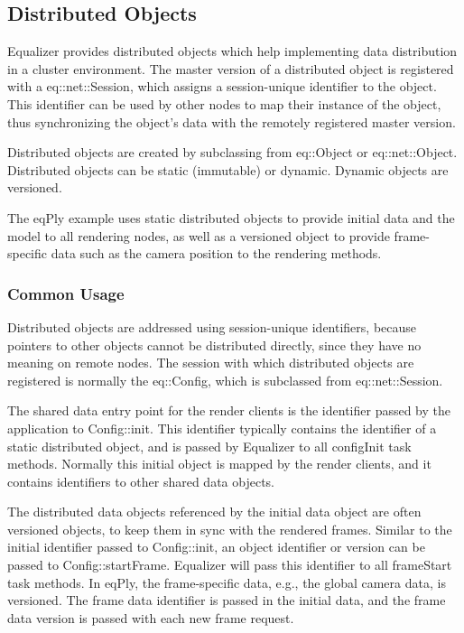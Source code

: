 \documentclass[10pt,a4]{scrartcl}
\begin{document}
\subsection{\label{sNetObject}Distributed Objects}

Equalizer provides distributed objects which help implementing data
distribution in a cluster environment. The master version of a
distributed object is registered with a \textsf{eq::net::Session}, which
assigns a session-unique identifier to the object. This identifier can
be used by other nodes to map their instance of the object, thus
synchronizing the object's data with the remotely registered master
version.

Distributed objects are created by subclassing from \textsf{eq::Object}
or \textsf{eq::net::Object}. Distributed objects can be static
(immutable) or dynamic. Dynamic objects are versioned.

The \textsf{eqPly} example uses static distributed objects to provide
initial data and the model to all rendering nodes, as well as a
versioned object to provide frame-specific data such as the camera
position to the rendering methods.

\subsubsection{Common Usage}

Distributed objects are addressed using session-unique identifiers,
because pointers to other objects cannot be distributed directly, since
they have no meaning on remote nodes. The session with which distributed
objects are registered is normally the \textsf{eq::Config}, which is
subclassed from \textsf{eq::net::Session}.

The shared data entry point for the render clients is the identifier
passed by the application to \textsf{Config::init}. This identifier
typically contains the identifier of a static distributed object, and is
passed by Equalizer to all \textsf{configInit} task methods. Normally
this initial object is mapped by the render clients, and it contains
identifiers to other shared data objects.

The distributed data objects referenced by the initial data object are
often versioned objects, to keep them in sync with the rendered
frames. Similar to the initial identifier passed to
\textsf{Config::init}, an object identifier or version can be passed to
\textsf{Config::startFrame}. Equalizer will pass this identifier to all
\textsf{frameStart} task methods. In \textsf{eqPly}, the frame-specific
data, e.g., the global camera data, is versioned. The frame data
identifier is passed in the initial data, and the frame data version is
passed with each new frame request.
\end{document}
